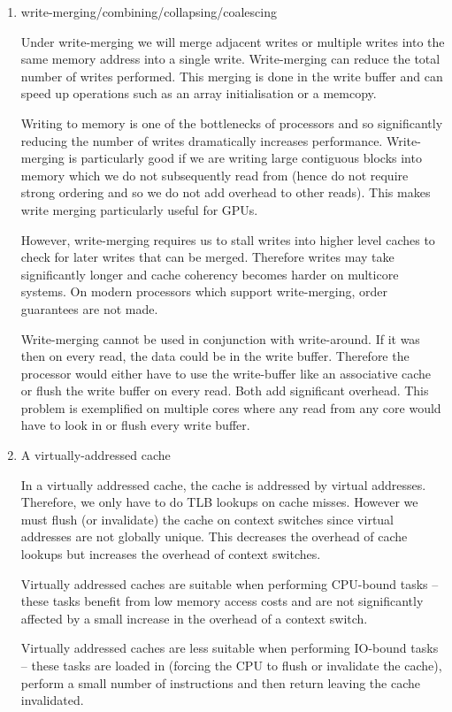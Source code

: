 \documentclass[10pt,\jkfside,a4paper]{article}
\begin{document}
\begin{enumerate}
\begin{enumerate}[label=(\alph*)]
\item write-merging/combining/collapsing/coalescing

Under write-merging we will merge adjacent writes or multiple writes into the
same memory address into a single write. Write-merging can reduce the
total number of writes performed. This merging is done in the write buffer
and can speed up operations such as an array initialisation or a
memcopy.

Writing to memory is one of the bottlenecks of processors and so
significantly reducing the number of writes dramatically increases
performance. Write-merging is particularly good if we are writing large
contiguous blocks into memory which we do not subsequently read from (hence
do not require strong ordering and so we do not add overhead to other reads).
This makes write merging particularly useful for GPUs.

However, write-merging requires us to stall writes into higher level caches
to check for later writes that can be merged. Therefore writes may take
significantly longer and cache coherency becomes harder on multicore systems.
On modern processors which support write-merging, order guarantees are not
made.

Write-merging cannot be used in conjunction with write-around. If it was
then on every read, the data could be in the write buffer. Therefore the
processor would either have to use the write-buffer like an associative
cache or flush the write buffer on every read. Both add significant
overhead. This problem is exemplified on multiple cores where any read from
any core would have to look in or flush every write buffer.

\item A virtually-addressed cache

In a virtually addressed cache, the cache is addressed by virtual addresses.
Therefore, we only have to do TLB lookups on cache misses. However we must
flush (or invalidate) the cache on context switches since virtual addresses
are not globally unique. This decreases the overhead of cache lookups but
increases the overhead of context switches.

Virtually addressed caches are suitable when performing CPU-bound tasks --
these tasks benefit from low memory access costs and are not significantly
affected by a small increase in the overhead of a context switch.

Virtually addressed caches are less suitable when performing IO-bound tasks --
these tasks are loaded in (forcing the CPU to flush or invalidate the
cache), perform a small number of instructions and then return leaving the
cache invalidated.


\end{enumerate}
\end{enumerate}
\end{document}
